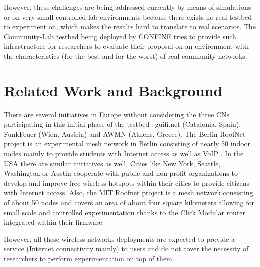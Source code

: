 \documentclass[conference]{IEEEtran}
\begin{document}

However, these challenges are being addressed currently by means of simulations 
or on very small controlled lab environments because there exists no real testbed
to experiment on, which makes the results hard to translate to real scenarios. The Community-Lab testbed
being deployed by CONFINE tries to provide such infrastructure for researchers to evaluate
their proposal on an environment with the characteristics (for the best and for the worst)
of real community networks.

\section{Related Work and Background}
\label{sec:related-work}

There are several initiatives in Europe without considering the three CNs participating in this initial
phase of the testbed --guifi.net (Catalonia, Spain), FunkFeuer (Wien, Austria) and AWMN (Athens, Greece). The Berlin RoofNet project is an
experimental mesh network in Berlin consisting of nearly 50 indoor nodes mainly to provide
students with Internet access as well as VoIP \cite{berlin-roofnet}. In the USA there are similar initiatives as well. Cities like New York, Seattle, Washington or Austin cooperate with
public and non-profit organizations to develop and improve free wireless hotspots within 
their cities to provide citizens with Internet access. Also, the MIT Roofnet \cite{mit-roofnet} project
is a mesh network consisting of about 50 nodes and covers an area of about four square
kilometers allowing for small scale and controlled experimentation thanks to the
Click Modular router integrated within their firmware. 

However, all these wireless networks deployments 
are expected to provide a service (Internet connectivity mainly) to users and do not
cover the necessity of researchers to perform experimentation on top of them.

\end{document}

